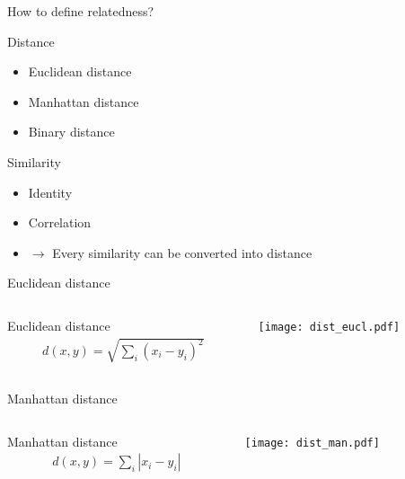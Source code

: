 \documentclass{beamer}\usepackage[]{graphicx}\usepackage[]{color}
\begin{document}
\begin{frame}[fragile]{How to define relatedness?}
  \begin{block}{Distance}
    \begin{itemize}
      \item Euclidean distance
      \item Manhattan distance
      \item Binary distance
    \end{itemize}
  \end{block}
  \begin{block}{Similarity}
    \begin{itemize}
      \item Identity
      \item Correlation
        \vspace{.3cm}
      \item $\rightarrow$ Every similarity can be converted into distance
    \end{itemize}
  \end{block}
\end{frame}

\begin{frame}[fragile]{Euclidean distance}
  \begin{columns}
    \begin{column}{.5\linewidth}
      \begin{Definition}{Euclidean distance}
        \begin{align*}
          d(x, y) = \sqrt{\sum_i (x_i - y_i)^2}
        \end{align*}
      \end{Definition}
    \end{column}
    \begin{column}{.5\linewidth}
      \begin{center}
        \texttt{[image: dist\_eucl.pdf]}
      \end{center}
    \end{column}
  \end{columns}
\end{frame}

\begin{frame}[fragile]{Manhattan distance}
  \begin{columns}
    \begin{column}{.5\linewidth}
      \begin{Definition}{Manhattan distance}
        \begin{align*}
          d(x, y) = \sum_i |x_i - y_i|
        \end{align*}
      \end{Definition}
    \end{column}
    \begin{column}{.5\linewidth}
      \begin{center}
        \texttt{[image: dist\_man.pdf]}
      \end{center}
    \end{column}
  \end{columns}
\end{frame}
\end{document}
